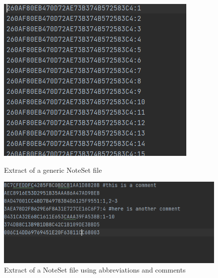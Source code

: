 \begin{figure}[!htb]
  \includegraphics[width=\linewidth]{images/notesetpicture1sm.png}
  \caption{Extract of a generic NoteSet file}\label{fig:ns_example_1}
\endminipage\hfill
{}
  \includegraphics[width=\linewidth]{images/notesetpicture2.png}
  \caption{Extract of a NoteSet file using abbreviations and comments}\label{fig:ns_example_2}
\endminipage\hfill
\end{figure}

